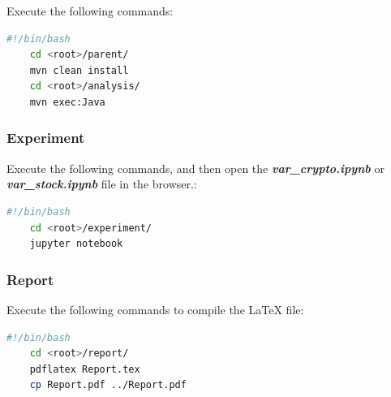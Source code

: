 \documentclass[11pt]{article} %
\theoremstyle{plain}
\theoremstyle{definition}
\begin{document}
Execute the following commands:

\begin{lstlisting}[language=bash]
    #!/bin/bash
    cd <root>/parent/
    mvn clean install
    cd <root>/analysis/
    mvn exec:Java
\end{lstlisting}

\subsubsection{Experiment}

Execute the following commands, and then open the \textsl{\textbf{var\_crypto.ipynb}} or \textsl{\textbf{var\_stock.ipynb}} file in the browser.:

\begin{lstlisting}[language=bash]
    #!/bin/bash
    cd <root>/experiment/
    jupyter notebook
\end{lstlisting}

\subsubsection{Report}

Execute the following commands to compile the LaTeX file:

\begin{lstlisting}[language=bash]
    #!/bin/bash
    cd <root>/report/
    pdflatex Report.tex
    cp Report.pdf ../Report.pdf
\end{lstlisting}



\end{document}
